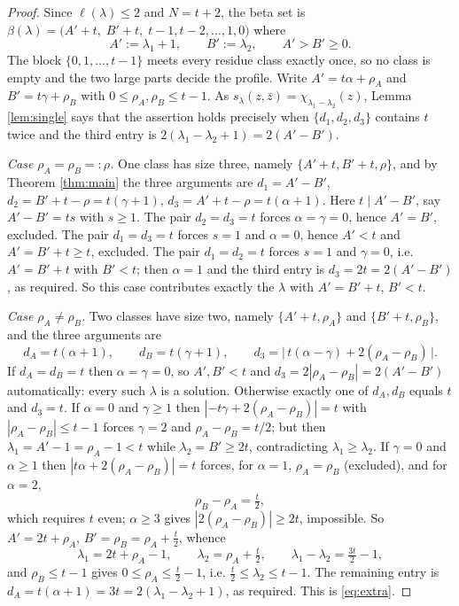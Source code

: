 \documentclass[11pt,reqno]{amsart}
\theoremstyle{plain}
\theoremstyle{definition}
\newcommand{\zb}{\bar z}
\begin{document}
\begin{proof}
Since $\ell(\lambda)\le 2$ and $N=t+2$, the beta set is
$\beta(\lambda)=\bigl(A'+t,\;B'+t,\;t-1,t-2,\dots,1,0\bigr)$ where
\[
A':=\lambda_1+1,\qquad B':=\lambda_2,\qquad A'>B'\ge0 .
\]
The block $\{0,1,\dots,t-1\}$ meets every residue class exactly once, so no class is empty and the
two large parts decide the profile. Write $A'=t\alpha+\rho_A$ and $B'=t\gamma+\rho_B$ with
$0\le\rho_A,\rho_B\le t-1$. As $s_\lambda(z,\zb)=\chi_{\lambda_1-\lambda_2}(z)$, Lemma
\ref{lem:single} says that the assertion holds precisely when $\{d_1,d_2,d_3\}$ contains $t$ twice
and the third entry is $2(\lambda_1-\lambda_2+1)=2(A'-B')$.

\emph{Case $\rho_A=\rho_B=:\rho$.} One class has size three, namely $\{A'+t,B'+t,\rho\}$, and by
Theorem \ref{thm:main} the three arguments are
$d_1=A'-B'$, $d_2=B'+t-\rho=t(\gamma+1)$, $d_3=A'+t-\rho=t(\alpha+1)$. Here $t\mid A'-B'$, say
$A'-B'=ts$ with $s\ge1$. The pair $d_2=d_3=t$ forces $\alpha=\gamma=0$, hence $A'=B'$, excluded.
The pair $d_1=d_3=t$ forces $s=1$ and $\alpha=0$, hence $A'<t$ and $A'=B'+t\ge t$, excluded. The pair
$d_1=d_2=t$ forces $s=1$ and $\gamma=0$, i.e. $A'=B'+t$ with $B'<t$; then $\alpha=1$ and the third
entry is $d_3=2t=2(A'-B')$, as required. So this case contributes exactly the $\lambda$ with
$A'=B'+t$, $B'<t$.

\emph{Case $\rho_A\ne\rho_B$.} Two classes have size two, namely $\{A'+t,\rho_A\}$ and
$\{B'+t,\rho_B\}$, and the three arguments are
\[
d_A=t(\alpha+1),\qquad d_B=t(\gamma+1),\qquad
d_3=\bigl|\,t(\alpha-\gamma)+2(\rho_A-\rho_B)\,\bigr| .
\]
If $d_A=d_B=t$ then $\alpha=\gamma=0$, so $A',B'<t$ and $d_3=2|\rho_A-\rho_B|=2(A'-B')$
automatically: every such $\lambda$ is a solution. Otherwise exactly one of $d_A,d_B$ equals $t$ and
$d_3=t$. If $\alpha=0$ and $\gamma\ge1$ then $|-t\gamma+2(\rho_A-\rho_B)|=t$ with
$|\rho_A-\rho_B|\le t-1$ forces $\gamma=2$ and $\rho_A-\rho_B=t/2$; but then
$\lambda_1=A'-1=\rho_A-1<t$ while $\lambda_2=B'\ge2t$, contradicting $\lambda_1\ge\lambda_2$. If
$\gamma=0$ and $\alpha\ge1$ then $|t\alpha+2(\rho_A-\rho_B)|=t$ forces, for $\alpha=1$,
$\rho_A=\rho_B$ (excluded), and for $\alpha=2$,
\[
\rho_B-\rho_A=\tfrac t2,
\]
which requires $t$ even; $\alpha\ge3$ gives $|2(\rho_A-\rho_B)|\ge2t$, impossible. So $A'=2t+\rho_A$,
$B'=\rho_B=\rho_A+\tfrac t2$, whence
\[
\lambda_1=2t+\rho_A-1,\qquad \lambda_2=\rho_A+\tfrac t2,\qquad
\lambda_1-\lambda_2=\tfrac{3t}{2}-1,
\]
and $\rho_B\le t-1$ gives $0\le\rho_A\le\tfrac t2-1$, i.e. $\tfrac t2\le\lambda_2\le t-1$. The
remaining entry is $d_A=t(\alpha+1)=3t=2(\lambda_1-\lambda_2+1)$, as required. This is
\eqref{eq:extra}.


\end{proof}
\end{document}
